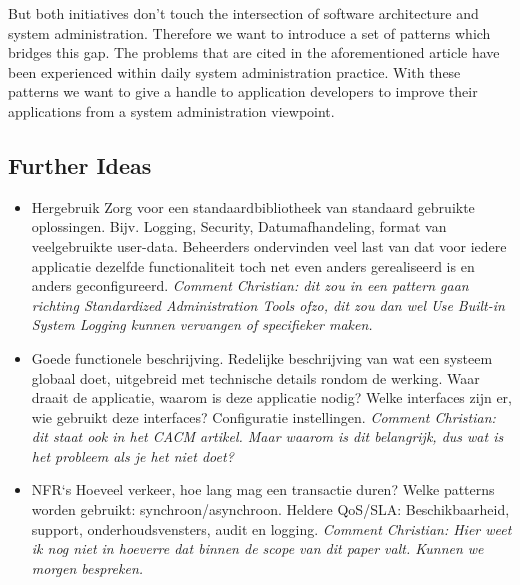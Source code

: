 But both initiatives don't touch the intersection of software architecture and system administration.
Therefore we want to introduce a set of patterns which bridges this gap. The problems that are cited in the aforementioned article have been experienced within daily system administration practice. With these patterns we want to give a handle to application developers to improve their applications from a system administration viewpoint. 


\subsection*{Further Ideas}
\begin{itemize}
\item Hergebruik
Zorg voor een standaardbibliotheek van standaard gebruikte oplossingen. Bijv. Logging, Security, Datumafhandeling, format van veelgebruikte user-data. Beheerders ondervinden veel last van dat voor iedere applicatie dezelfde functionaliteit toch net even anders gerealiseerd is en anders geconfigureerd. \textit{Comment Christian: dit zou in een pattern gaan richting {\sc Standardized Administration Tools} ofzo, dit zou dan wel {\sc Use Built-in System Logging} kunnen vervangen of specifieker maken.}
\item Goede functionele beschrijving. Redelijke beschrijving van wat een systeem globaal doet, uitgebreid met technische details rondom de werking. Waar draait de applicatie, waarom is deze applicatie nodig? Welke interfaces zijn er, wie gebruikt deze interfaces? Configuratie instellingen. \textit{Comment Christian: dit staat ook in het CACM artikel. Maar waarom is dit belangrijk, dus wat is het probleem als je het niet doet?}
\item NFR`s Hoeveel verkeer, hoe lang mag een transactie duren? Welke patterns worden gebruikt: synchroon/asynchroon. Heldere QoS/SLA: Beschikbaarheid, support, onderhoudsvensters, audit en logging. \textit{Comment Christian: Hier weet ik nog niet in hoeverre dat binnen de scope van dit paper valt. Kunnen we morgen bespreken.}

\end{itemize}